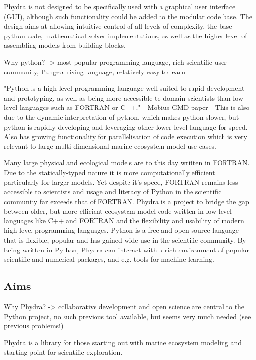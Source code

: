 \documentclass[journal abbreviation, manuscript]{copernicus}
\begin{document}
Phydra is not designed to be specifically used with a graphical user interface (GUI), although such functionality could be added to the modular code base.
The design aims at allowing intuitive control of all levels of complexity, the base python code, mathematical solver implementations, as well as the higher level of assembling models from building blocks.

Why python? -> most popular programming language, rich scientific user community, Pangeo, rising language, relatively easy to learn

"Python is a high-level programming language well suited to rapid development and prototyping, as well as being more accessible to domain scientists than low-level languages such as FORTRAN or C++." - Mobius GMD paper
- This is also due to the dynamic interpretation of python, which makes python slower, but python is rapidly developing and leveraging other lower level language for speed. Also has growing functionality for parallelisation of code execution which is very relevant to large multi-dimensional marine ecosystem model use cases. 

Many large physical and ecological models are to this day written in FORTRAN. Due to the statically-typed nature it is more computationally efficient particularly for larger models. Yet despite it's speed, FORTRAN remains less accessible to scientists and usage and literacy of Python in the scientific community far exceeds that of FORTRAN.
Phydra is a project to bridge the gap between older, but more efficient ecosystem model code written in low-level languages like C++ and FORTRAN and the flexibility and usability of modern high-level programming languages. Python is a free and open-source language that is flexible, popular and has gained wide use in the scientific community. By being written in Python, Phydra can interact with a rich environment of popular scientific and numerical packages, and e.g. tools for machine learning. 


\subsection{Aims}
Why Phydra? -> collaborative development and open science are central to the Python project, no such previous tool available, but seems very much needed (see previous problems!)

Phydra is a library for those starting out with marine ecosystem modeling and starting point for scientific exploration.
\end{document}
